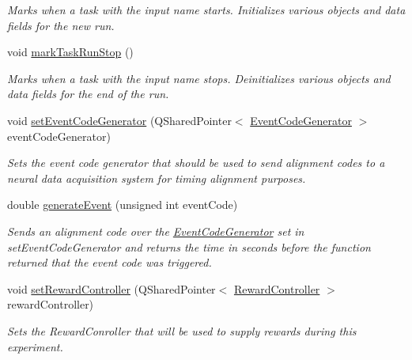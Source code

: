 \begin{DoxyCompactItemize}
\begin{DoxyCompactList}\small\item\em Marks when a task with the input name starts. Initializes various objects and data fields for the new run. \end{DoxyCompactList}\item 
\hypertarget{class_picto_1_1_engine_1_1_picto_engine_a0229ae00604fe173ccebc79509d84518}{void \hyperlink{class_picto_1_1_engine_1_1_picto_engine_a0229ae00604fe173ccebc79509d84518}{mark\-Task\-Run\-Stop} ()}\label{class_picto_1_1_engine_1_1_picto_engine_a0229ae00604fe173ccebc79509d84518}

\begin{DoxyCompactList}\small\item\em Marks when a task with the input name stops. Deinitializes various objects and data fields for the end of the run. \end{DoxyCompactList}\item 
void \hyperlink{class_picto_1_1_engine_1_1_picto_engine_a28e2fcc1ad7a6dccdda9581bf00198bc}{set\-Event\-Code\-Generator} (Q\-Shared\-Pointer$<$ \hyperlink{class_picto_1_1_event_code_generator}{Event\-Code\-Generator} $>$ event\-Code\-Generator)
\begin{DoxyCompactList}\small\item\em Sets the event code generator that should be used to send alignment codes to a neural data acquisition system for timing alignment purposes. \end{DoxyCompactList}\item 
double \hyperlink{class_picto_1_1_engine_1_1_picto_engine_af046184e2982b0aa9e868ade9f0fdb91}{generate\-Event} (unsigned int event\-Code)
\begin{DoxyCompactList}\small\item\em Sends an alignment code over the \hyperlink{class_picto_1_1_event_code_generator}{Event\-Code\-Generator} set in set\-Event\-Code\-Generator and returns the time in seconds before the function returned that the event code was triggered. \end{DoxyCompactList}\item 
void \hyperlink{class_picto_1_1_engine_1_1_picto_engine_a80fece7b005d1445ac5878c275ceb471}{set\-Reward\-Controller} (Q\-Shared\-Pointer$<$ \hyperlink{class_picto_1_1_reward_controller}{Reward\-Controller} $>$ reward\-Controller)
\begin{DoxyCompactList}\small\item\em Sets the Reward\-Conroller that will be used to supply rewards during this experiment. \end{DoxyCompactList}\item 

\end{DoxyCompactItemize}
